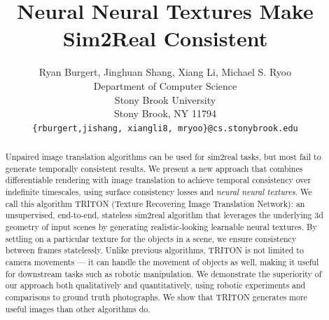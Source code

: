 \documentclass{article}
\title{Neural Neural Textures Make Sim2Real Consistent}
\author{%
	Ryan Burgert, Jinghuan Shang, Xiang Li, Michael S. Ryoo\\
	Department of Computer Science\\
	Stony Brook University\\
	Stony Brook, NY 11794 \\
	\texttt{\{rburgert,jishang, xiangli8, mryoo\}@cs.stonybrook.edu} \\
}
\begin{document}
\maketitle


\begin{abstract}
	Unpaired image translation algorithms can be used for sim2real tasks, but most fail to generate temporally consistent results.
	We present a new approach that combines differentiable rendering with image translation to achieve temporal consistency over indefinite timescales, using surface consistency losses and \emph{neural neural textures}.
	We call this algorithm TRITON (Texture Recovering Image Translation Network): an unsupervised, end-to-end, stateless sim2real algorithm that 
	leverages the underlying 3d geometry of input scenes by generating realistic-looking learnable neural textures.
	By settling on a particular texture for the objects in a scene, we ensure consistency between frames statelessly.
	Unlike previous algorithms, TRITON is not limited to camera movements --- it can handle the movement of objects as well, making it useful for downstream tasks such as robotic manipulation.
		We demonstrate the superiority of our approach both qualitatively and quantitatively, using robotic experiments and comparisons to ground truth photographs. We show that TRITON generates more useful images than other algorithms do.
\end{abstract}
\end{document}
